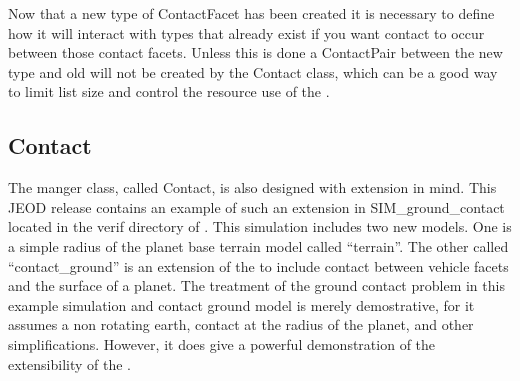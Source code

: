 Now that a new type of ContactFacet has been created it is necessary to define how it will interact with types that already exist if you want contact to occur between those contact facets.  Unless this is done a ContactPair between the new type and old will not be created by the Contact class, which can be a good way to limit list size and control the resource use of the \ModelDesc.

\subsection{Contact}
The manger class, called Contact, is also designed with extension in mind. This JEOD release contains an example of such an extension in SIM\_ground\_contact located in the verif directory of \ModelDesc. This simulation includes two new models. One is a simple radius of the planet base terrain model called ``terrain''. The other called ``contact\_ground'' is an extension of the \ModelDesc to include contact between vehicle facets and the surface of a planet.  The treatment of the ground contact problem in this example simulation and contact ground model is merely demostrative, for it assumes a non rotating earth, contact at the radius of the planet, and other simplifications.  However, it does give a powerful demonstration of the extensibility of the \ModelDesc.
